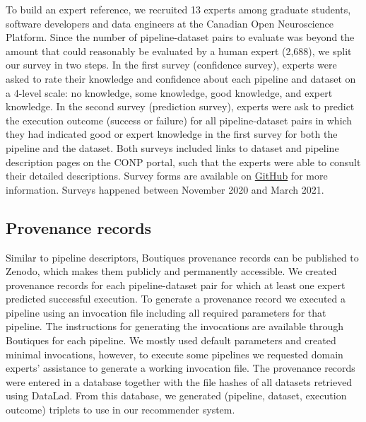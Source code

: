 To build an expert reference, we recruited 13 experts among graduate
students, software developers and data engineers at the Canadian Open
Neuroscience Platform. Since the number of pipeline-dataset pairs to
evaluate was beyond the amount that could reasonably be evaluated by a
human expert (2,688), we split our survey in two steps. In the first survey
(confidence survey), experts were asked to rate their knowledge and
confidence about each pipeline and dataset on a 4-level scale: no
knowledge, some knowledge, good knowledge, and expert knowledge. In the second
survey (prediction survey), experts were ask to predict the execution
outcome (success or failure) for all pipeline-dataset pairs in which they
had indicated good or expert knowledge in the first survey for both the
pipeline and the dataset. Both surveys included links to dataset and pipeline description pages on the CONP portal, such that the experts were able to consult their detailed descriptions. Survey forms are available on \href{https://github.com/big-data-lab-team/paper-pipelines-datasets-recommender/blob/master/data}{GitHub} for more information. Surveys happened between November 2020 and March 2021.


\subsection{Provenance records} 

Similar to pipeline descriptors, Boutiques provenance records can be
published to Zenodo, which makes them publicly and permanently accessible.
We created provenance records for each pipeline-dataset pair for which at least one expert predicted successful execution. To generate a provenance record we executed a pipeline using an invocation file including all required parameters for that pipeline. The instructions for generating the invocations are available through Boutiques for each pipeline. We mostly used default parameters and created minimal invocations, however, to execute some pipelines we requested domain experts' assistance to generate a working invocation file.
The provenance records were entered in a database together with the file hashes of all datasets retrieved using DataLad. From this database, we generated (pipeline, dataset, execution outcome) triplets to use in our recommender system.




